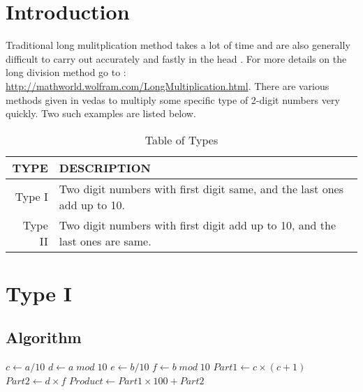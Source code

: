 \section{Introduction}
Traditional long mulitplication method  takes a lot of time and are also generally difficult to carry out accurately and fastly in the head \cite{google}. For more details on the long division method go to : \url{http://mathworld.wolfram.com/LongMultiplication.html}. There are various methods given in vedas to multiply some specific type of 2-digit numbers very quickly. Two such examples are listed below. \cite{vedas} \cite{vedic}

\begin{table}[h]
	\begin{center}
		\begin{tabular}{|r | l|}
			\hline
			\textbf{TYPE} & \textbf{DESCRIPTION} \\
			\hline
			Type I & Two digit numbers with first digit same, and the last ones add up to 10. \\
			\hline
			Type II & Two digit numbers with first digit add up to 10, and the last ones are same. \\
			\hline
		\end{tabular}
		\caption{Table of Types}
	\end{center}
\end{table}

\section{Type I}
\subsection{Algorithm}
\label{Type I:algorithm}
	\begin{algorithm}
		\begin{algorithmic}
				\State $c \gets a/10$ 	
				\State $d \gets a \; mod \; 10$ 	
				\State $e \gets b/10$ 
				\State $f \gets b \; mod \; 10$ 	
					\State $Part1 \gets c \times (c+1)$
					\State $Part2 \gets d \times f$
					\State $Product \gets Part1 \times 100 + Part2$ 
				\Else
				\EndIf
			\EndProcedure
		\end{algorithmic}
	\end{algorithm}

